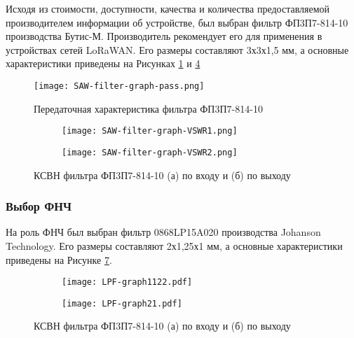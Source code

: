 Исходя из стоимости, доступности, качества и количества предоставляемой производителем информации об устройстве, был выбран фильтр ФП3П7-814-10 производства Бутис-М. Производитель рекомендует его для применения в устройствах сетей LoRaWAN. Его размеры составляют 3х3х1,5 мм, а основные характеристики приведены на Рисунках \ref{fig:SAW-filter-graph-pass} и \ref{fig:SAW-filter-graph-VSWR}

\begin{figure}[H]
	\centering
	\texttt{[image: SAW-filter-graph-pass.png]}
	\caption{Передаточная характеристика фильтра ФП3П7-814-10}%
	\label{fig:SAW-filter-graph-pass}
\end{figure}

\begin{figure}[H]
	\centering
	\begin{subfigure}[b]{0.49\textwidth}
		\centering
		\texttt{[image: SAW-filter-graph-VSWR1.png]}
		\caption{}%
		\label{fig:SAW-filter-graph-VSWR1}
	\end{subfigure}
	\hfill
	\begin{subfigure}[b]{0.49\textwidth}
		\centering
		\texttt{[image: SAW-filter-graph-VSWR2.png]}
		\caption{}%
		\label{fig:SAW-filter-graph-VSWR2}
	\end{subfigure}
	\caption{%
		КСВН фильтра ФП3П7-814-10
		(а) по входу и
		(б) по выходу 
	}%
	\label{fig:SAW-filter-graph-VSWR}
\end{figure}

\subsubsection{Выбор ФНЧ}
На роль ФНЧ был выбран фильтр 0868LP15A020 производства Johanson Technology. Его размеры составляют 2х1,25х1 мм, а основные характеристики приведены на Рисунке \ref{fig:LPF-graph}.

\begin{figure}[H]
	\centering
	\begin{subfigure}[b]{0.49\textwidth}
		\centering
		\texttt{[image: LPF-graph1122.pdf]}
		\caption{}%
		\label{fig:LPF-graph1122}
	\end{subfigure}
	\hfill
	\begin{subfigure}[b]{0.49\textwidth}
		\centering
		\texttt{[image: LPF-graph21.pdf]}
		\caption{}%
		\label{fig:LPF-graph21}
	\end{subfigure}
	\caption{%
		КСВН фильтра ФП3П7-814-10
		(а) по входу и
		(б) по выходу 
	}%
	\label{fig:LPF-graph}
\end{figure}


